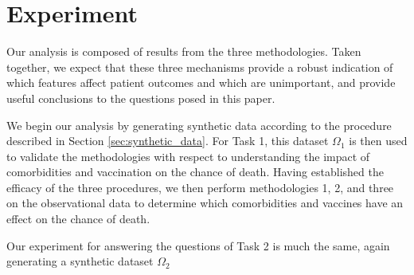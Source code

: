 \section{Experiment}

Our analysis is composed of results from the three methodologies. Taken together, we expect that these three mechanisms provide a robust indication of which features affect patient outcomes and which are unimportant, and provide useful conclusions to the questions posed in this paper. %


We begin our analysis by generating synthetic data according to the procedure described in Section \ref{sec:synthetic_data}. For Task 1, this dataset $\Omega_1$ is then used to validate the methodologies with respect to understanding the impact of comorbidities and vaccination on the chance of death. Having established the efficacy of the three procedures, we then perform methodologies 1, 2, and three on the observational data to determine which comorbidities and vaccines have an effect on the chance of death.

Our experiment for answering the questions of Task 2 is much the same, again generating a synthetic dataset $\Omega_2$



